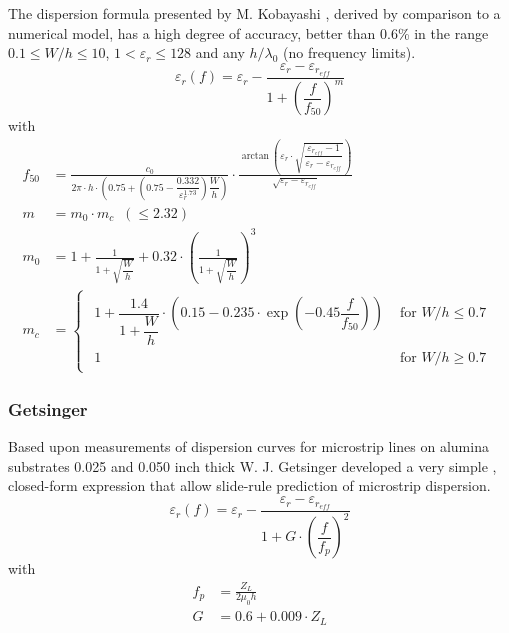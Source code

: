 The dispersion formula presented by M. Kobayashi \cite{Kobayashi},
derived by comparison to a numerical model, has a high degree of
accuracy, better than 0.6\% in the range $0.1 \le W/h \le 10$, $1 <
\varepsilon_r \le 128$ and any $h/\lambda_0$ (no frequency limits).
\begin{equation}
\varepsilon_{r}(f) = \varepsilon_{r} - \frac{\varepsilon_{r} - \varepsilon_{r_{eff}}}{1 + \left(\dfrac{f}{f_{50}}\right)^{m}}
\end{equation}
with
\begin{align}
f_{50} &= \frac{c_{0}}{2\pi\cdot h \cdot\left(0.75 + \left(0.75 - \dfrac{0.332}{\varepsilon_{r}^{1.73}}\right)\dfrac{W}{h}\right)} \cdot \frac{\arctan\left(\varepsilon_{r}\cdot\sqrt{\dfrac{\varepsilon_{r_{eff}} - 1}{\varepsilon_{r} - \varepsilon_{r_{eff}}}}\right)}{\sqrt{\varepsilon_{r} - \varepsilon_{r_{eff}}}}\\
m &= m_{0}\cdot m_{c} \;\; (\le 2.32)\\
m_{0} &= 1 + \frac{1}{1 + \sqrt{\dfrac{W}{h}}} + 0.32\cdot\left(\frac{1}{1 + \sqrt{\dfrac{W}{h}}}\right)^{3}\\
m_{c} &=
\begin{cases}
\begin{array}{ll}
1 + \dfrac{1.4}{1 + \dfrac{W}{h}}\cdot\left(0.15 - 0.235\cdot\exp\left(-0.45\dfrac{f}{f_{50}}\right)\right) & \textrm{ for } W / h \le 0.7\\
1 & \textrm{ for } W / h \ge 0.7
\end{array}
\end{cases}
\end{align}

\subsubsection{Getsinger}

Based upon measurements of dispersion curves for microstrip lines on
alumina substrates 0.025 and 0.050 inch thick W. J. Getsinger
\cite{Getsinger} developed a very simple , closed-form expression that
allow slide-rule prediction of microstrip dispersion.
\begin{equation}
\varepsilon_{r}(f) = \varepsilon_{r} - \frac{\varepsilon_{r} - \varepsilon_{r_{eff}}}{1 + G\cdot \left(\dfrac{f}{f_{p}}\right)^{2}}
\end{equation}
with
\begin{align}
\label{eq:GetFp}
f_{p} &= \frac{Z_{L}}{2\mu_{0} h}\\
\label{eq:GetG}
G &= 0.6 + 0.009\cdot Z_{L}
\end{align}

